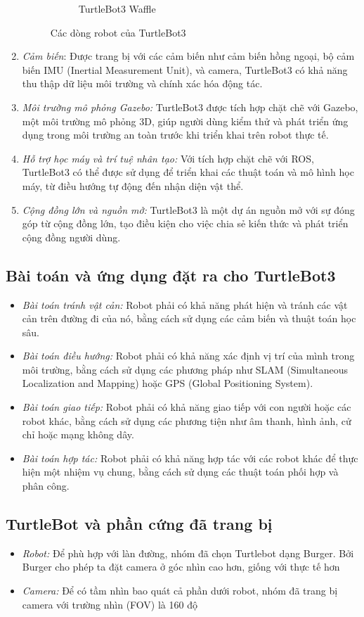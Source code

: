 \begin{enumerate}
\begin{figure}[htp]
\begin{subfigure}{0.5\textwidth}
        \caption{TurtleBot3 Waffle}
        \end{subfigure}
    \caption{Các dòng robot của TurtleBot3}
    \end{figure}
    \item \textit{Cảm biến}: Được trang bị với các cảm biến như cảm biến hồng ngoại, bộ cảm biến IMU (Inertial Measurement Unit), và camera, TurtleBot3 có khả năng thu thập dữ liệu môi trường và chính xác hóa động tác.
    \item \textit{Môi trường mô phỏng Gazebo:} TurtleBot3 được tích hợp chặt chẽ với Gazebo, một môi trường mô phỏng 3D, giúp người dùng kiểm thử và phát triển ứng dụng trong môi trường an toàn trước khi triển khai trên robot thực tế.
    \item \textit{Hỗ trợ học máy và trí tuệ nhân tạo:} Với tích hợp chặt chẽ với ROS, TurtleBot3 có thể được sử dụng để triển khai các thuật toán và mô hình học máy, từ điều hướng tự động đến nhận diện vật thể.
    \item \textit{Cộng đồng lớn và nguồn mở:} TurtleBot3 là một dự án nguồn mở với sự đóng góp từ cộng đồng lớn, tạo điều kiện cho việc chia sẻ kiến thức và phát triển cộng đồng người dùng.
\end{enumerate}
\subsection{Bài toán và ứng dụng đặt ra cho TurtleBot3}
\begin{itemize}
    \item \textit{Bài toán tránh vật cản:} Robot phải có khả năng phát hiện và tránh các vật cản trên đường đi của nó, bằng cách sử dụng các cảm biến và thuật toán học sâu.
    \item \textit{Bài toán điều hướng:} Robot phải có khả năng xác định vị trí của mình trong môi trường, bằng cách sử dụng các phương pháp như SLAM (Simultaneous Localization and Mapping) hoặc GPS (Global Positioning System).
    \item \textit{Bài toán giao tiếp:} Robot phải có khả năng giao tiếp với con người hoặc các robot khác, bằng cách sử dụng các phương tiện như âm thanh, hình ảnh, cử chỉ hoặc mạng không dây.
    \item \textit{Bài toán hợp tác:} Robot phải có khả năng hợp tác với các robot khác để thực hiện một nhiệm vụ chung, bằng cách sử dụng các thuật toán phối hợp và phân công.
\end{itemize}
\subsection{TurtleBot và phần cứng đã trang bị}
\begin{itemize}
    \item \textit{Robot:} Để phù hợp với làn đường, nhóm đã chọn Turtlebot dạng Burger. Bởi Burger cho phép ta đặt camera ở góc nhìn cao hơn, giống với thực tế hơn
    \item \textit{Camera:} Để có tầm nhìn bao quát cả phần dưới robot, nhóm đã trang bị camera với trường nhìn (FOV) là 160 độ
\end{itemize}

